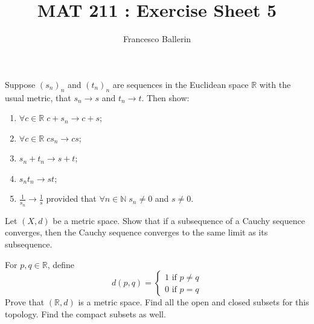 \documentclass[11pt]{article}%
\title{MAT 211 : Exercise Sheet 5}
\author{Francesco Ballerin}
\date{\color{gray}{\small{francesco.ballerin@uib.no}}}
\newcommand{\R}{\mathbb{R}}
\newcommand{\N}{\mathbb{N}}
\begin{document}
\begin{minipage}[t]{\dimexpr \textwidth-6cm-\columnsep}
     \maketitle
\end{minipage}
\hfill\noindent{}

\vspace{50pt}

\begin{Exercise}[title=**]
	Suppose $(s_n)_n$ and $(t_n)_n$ are sequences in the Euclidean space $\R$ with the usual metric, that $s_n\to s$ and $t_n\to t$. Then show:
	\begin{enumerate}[label={\alph*)}]
		\item $\forall c\in\R\; c+s_n\to c+s$;
		\item $\forall c\in\R\; cs_n\to cs$;
		\item $s_n +t_n\to s+t$;
		\item $s_n t_n\to st$;
		\item $\frac{1}{s_n}\to \frac{1}{s}$ provided that $\forall n\in\N\; s_n\neq 0$ and $s\neq 0$.
	\end{enumerate}
\end{Exercise}

\begin{Exercise}[title=*]
	Let $(X,d)$ be a metric space. Show that if a subsequence of a Cauchy sequence converges, then the Cauchy sequence converges to the same limit as its subsequence.
\end{Exercise}

\begin{Exercise}[title=**]
	For $p,q\in \R$, define
	$$d(p,q)=\left\{
	\begin{array}{l}
		1 \text{ if } p\neq q\\
		0 \text{ if } p= q
	\end{array}\right.$$
	Prove that $(\R,d)$ is a metric space. Find all the open and closed subsets for this topology. Find the compact subsets as well.
\end{Exercise}
\end{document}
